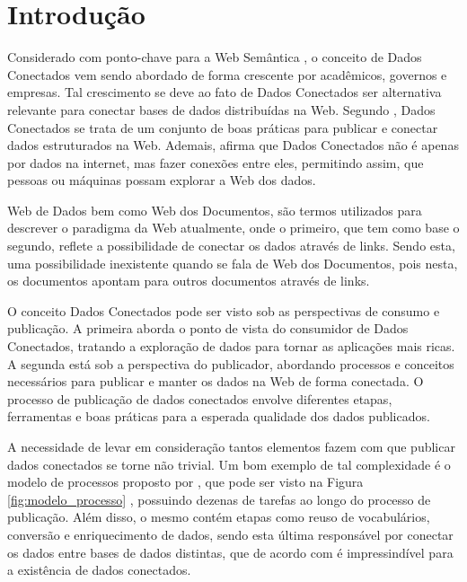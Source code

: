 \chapter{Introdução}
\label{cap:introducao}
Considerado com ponto-chave para a Web Semântica \cite{berners2001semantic}, o conceito de Dados Conectados vem sendo abordado de forma crescente por acadêmicos, governos e empresas. Tal crescimento se deve ao fato de Dados Conectados ser alternativa relevante para conectar bases de dados distribuídas na Web. Segundo , Dados Conectados se trata de um conjunto de boas práticas para publicar e conectar dados estruturados na Web. Ademais,  afirma que Dados Conectados não é apenas por dados na internet, mas fazer conexões entre eles, permitindo assim, que pessoas ou máquinas possam explorar a Web dos dados.

Web de Dados bem como Web dos Documentos, são termos utilizados para descrever o paradigma da Web atualmente, onde o primeiro, que tem como base o segundo, reflete a possibilidade de conectar os dados através de links. Sendo esta, uma possibilidade inexistente quando se fala de Web dos Documentos, pois nesta, os documentos apontam para outros documentos através de links. 

O conceito Dados Conectados pode ser visto sob as perspectivas de consumo e publicação. A primeira aborda o ponto de vista do consumidor de Dados Conectados, tratando a exploração de dados para tornar as aplicações mais ricas. A segunda está sob a perspectiva do publicador, abordando processos \cite{bizer2007publish, hyland2011joy, villazon2011methodological, Avila2015} e conceitos \cite{berners2006linked, wood2014linked} necessários para publicar e manter os dados na Web de forma conectada. O processo de publicação de dados conectados envolve diferentes etapas, ferramentas e boas práticas para a esperada qualidade dos dados publicados. 

A necessidade de levar em consideração tantos elementos fazem com que publicar dados conectados se torne não trivial. Um bom exemplo de tal complexidade é o modelo de processos proposto por , que pode ser visto na Figura \ref{fig:modelo_processo} , possuindo dezenas de tarefas ao longo do processo de publicação. Além disso, o mesmo contém etapas como reuso de vocabulários, conversão  e enriquecimento de dados, sendo esta última responsável por conectar os dados entre bases de dados distintas, que de acordo com  é impressindível para a existência de dados conectados.

